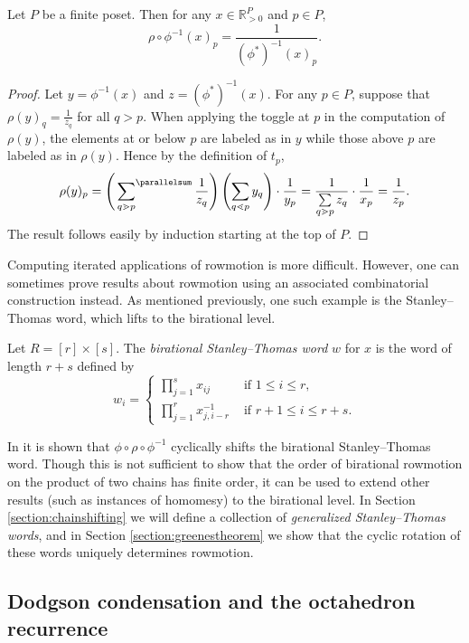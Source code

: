 \begin{Lemma} \label{lemma:dualtransfer}
Let $P$ be a finite poset. Then for any $x \in \mathbb{R}_{>0}^{P}$ and $p \in P$,
\[ \rho \circ \phi^{-1}(x)_p = \frac{1}{\left(\phi^*\right)^{-1}(x)_p}.\]
\end{Lemma}
\begin{proof}
Let $y = \phi^{-1}(x)$ and $z = (\phi^*)^{-1}(x)$. For any $p \in P$, suppose that $\rho(y)_q = \frac{1}{z_q}$ for all $q > p$. When applying the toggle at $p$ in the computation of $\rho(y)$, the elements at or below $p$ are labeled as in $y$ while those above $p$ are labeled as in $\rho(y)$. Hence by the definition of $t_p$,
\[
    \rho(y)_p =  \left( \sideset{}{^{\parallelsum}} \sum\limits_{q \gtrdot p} \frac{1}{z_q} \right) \left(\sum\limits_{q \lessdot p} y_q \right) \cdot \frac{1}{y_p}  = \frac{1}{\sum\limits_{q \gtrdot p}z_q} \cdot \frac{1}{x_p} = \frac{1}{z_p}.
\]
The result follows easily by induction starting at the top of $P$.
\end{proof}

Computing iterated applications of rowmotion is more difficult. However, one can sometimes prove results about rowmotion using an associated combinatorial construction instead. As mentioned previously, one such example is the Stanley--Thomas word, which lifts to the birational level.

\begin{Def}
Let $R = [r] \times [s]$. The \emph{birational Stanley--Thomas word} $w$ for $x$ is the word of length $r+s$ defined by
\[w_i = \begin{cases} \prod\limits_{j=1}^s x_{ij} &\text{ if } 1\leq i \leq r, \\ \prod\limits_{j=1}^r x_{j,i-r}^{-1} &\text{ if } r+1\leq i \leq r+s.\end{cases}\]
\end{Def}

In \cite{josephroby1} it is shown that $\phi \circ \rho \circ \phi^{-1}$ cyclically shifts the birational Stanley--Thomas word. Though this is not sufficient to show that the order of birational rowmotion on the product of two chains has finite order, it can be used to extend other results (such as instances of homomesy) to the birational level. In Section \ref{section:chainshifting} we  will define a collection of \emph{generalized Stanley--Thomas words}, and in Section \ref{section:greenestheorem} we show that the cyclic rotation of these words uniquely determines rowmotion.

\subsection{Dodgson condensation and the octahedron recurrence} \label{sec:octahedron}

